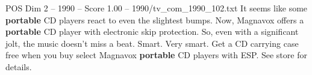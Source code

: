 \begin{textsample}{POS Dim 2 – 1990 – Score 1.00 – 1990/tv\_com\_1990\_102.txt}  \label{ex:f2_pos_035}
It seems like some \textbf{portable} CD players react to even the slightest bumps.
Now, Magnavox offers a \textbf{portable} CD player with electronic skip protection.
So, even with a significant jolt, the music doesn't miss a beat.
Smart.
Very smart.
Get a CD carrying case free when you buy select Magnavox \textbf{portable} CD players with ESP.
See store for details.

\end{textsample}
